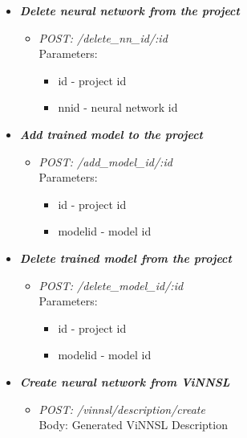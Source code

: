 \begin{itemize}


\item \textbf{\textit{Delete neural network from the project}}
\begin{itemize}
\item \emph{POST: /delete\_nn\_id/:id}
\\Parameters:
\begin{itemize}
\item id - project id 
\item nnid - neural network id
\end{itemize}
\end{itemize}




\item \textbf{\textit{Add trained model to the project}}
\begin{itemize}
\item \emph{POST: /add\_model\_id/:id}
\\Parameters:
\begin{itemize}
\item id - project id 
\item modelid - model id
\end{itemize}
\end{itemize}




\item \textbf{\textit{Delete trained model from the project}}
\begin{itemize}
\item \emph{POST: /delete\_model\_id/:id}
\\Parameters:
\begin{itemize}
\item id - project id 
\item modelid - model id
\end{itemize}
\end{itemize}




\item \textbf{\textit{Create neural network from ViNNSL}}
\begin{itemize}
\item \emph{POST: /vinnsl/description/create}
\\Body: Generated ViNNSL Description
\end{itemize}



\end{itemize}
